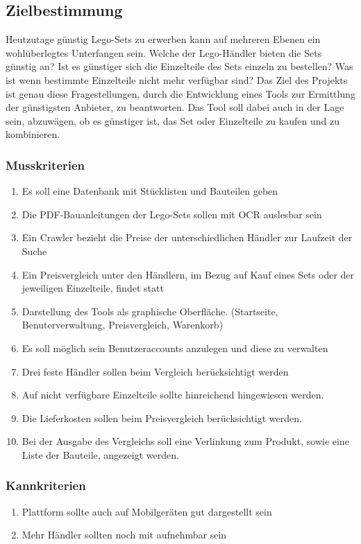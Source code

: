 \subsection{Zielbestimmung}

Heutzutage günstig Lego-Sets zu erwerben kann auf mehreren Ebenen ein wohlüberlegtes Unterfangen sein. Welche der Lego-Händler bieten die Sets günstig an? Ist es günstiger sich die Einzelteile des Sets einzeln zu bestellen? Was ist wenn bestimmte Einzelteile nicht mehr verfügbar sind? \newline
Das Ziel des Projekts ist genau diese Fragestellungen, durch die Entwicklung eines Tools zur Ermittlung der günstigsten Anbieter, zu beantworten. Das Tool soll dabei auch in der Lage sein, abzuwägen, ob es günstiger ist, das Set oder Einzelteile zu kaufen und zu kombinieren.

\subsubsection{Musskriterien}
\begin{enumerate}
\item Es soll eine Datenbank mit Stücklisten und Bauteilen geben
\item Die PDF-Bauanleitungen der Lego-Sets sollen mit OCR auslesbar sein
\item Ein Crawler bezieht die Preise der unterschiedlichen Händler zur Laufzeit der Suche
\item  Ein Preisvergleich unter den Händlern, im Bezug auf Kauf eines Sets oder der jeweiligen Einzelteile, findet statt
\item Darstellung des Tools als graphische Oberfläche. (Startseite, Benuterverwaltung, Preisvergleich, Warenkorb)
\item Es soll möglich sein Benutzeraccounts anzulegen und diese zu verwalten
\item Drei feste Händler sollen beim Vergleich berücksichtigt werden
\item Auf nicht verfügbare Einzelteile sollte hinreichend hingewiesen werden.
\item Die Lieferkosten sollen beim Preisvergleich berücksichtigt werden.
\item Bei der Ausgabe des Vergleichs soll eine Verlinkung zum Produkt, sowie eine Liste der Bauteile, angezeigt werden.
\end{enumerate}

\subsubsection{Kannkriterien}
\begin{enumerate}
\item Plattform sollte auch auf Mobilgeräten gut dargestellt sein
\item Mehr Händler sollten noch mit aufnehmbar sein
\end{enumerate}

